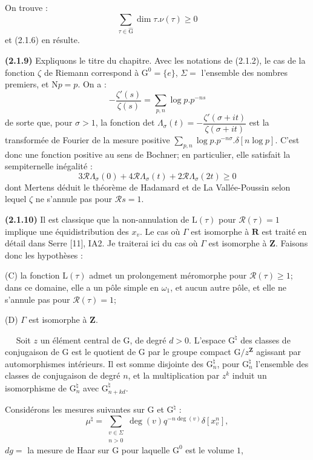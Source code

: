 \documentclass[11pt,leqno]{article}
\newcommand{\Page}[1]{\ifvmode\noindent\else\unskip\ \fi{\footnotesize\textcolor{gray}{[p.\,#1]}}\ \ignorespaces}
\begin{document}
On trouve :
\[
\sum_{\tau\in\widehat{\mathrm{G}}}\dim\tau.\nu(\tau)\geq0
\]
et (2.1.6) en résulte.

\textbf{(2.1.9)} Expliquons le titre du chapitre. Avec les notations de (2.1.2), le cas de la fonction \(\zeta\) de Riemann correspond à \(\mathrm{G}^0=\{e\}\), \(\Sigma=\) l’ensemble des nombres premiers, et \(\mathrm{N}p=p\). On a :
\[
-\frac{\zeta'(s)}{\zeta(s)}
 =\sum_{p,n}\log p.p^{-ns}
\]
de sorte que, pour \(\sigma>1\), la fonction det \(\Lambda_\sigma(t)=-\dfrac{\zeta'(\sigma+it)}{\zeta(\sigma+it)}\) est la transformée de Fourier de la mesure positive \(\displaystyle\sum_{p,n}\log p.p^{-n\sigma}.\delta[n\log p]\). C’est donc une fonction positive au sens de Bochner; en particulier, elle satisfait la sempiternelle inégalité :
\[
3\mathscr{R}\Lambda_\sigma(0)
 +4\mathscr{R}\Lambda_\sigma(t)
 +2\mathscr{R}\Lambda_\sigma(2t)\geq0
\]
dont Mertens déduit le théorème de Hadamard et de La Vallée-Poussin selon lequel \(\zeta\) ne s’annule pas pour \(\mathscr{R}s=1\).

\textbf{(2.1.10)} Il est classique que la non-annulation de \(\mathrm{L}(\tau)\) pour \(\mathscr{R}(\tau)=1\) implique une équidistribution des \(x_v\). Le cas où \(\Gamma\) est isomorphe à \(\mathbf{R}\) est traité en détail dans Serre [11], IA2. Je traiterai ici du cas où \(\Gamma\) est isomorphe à \(\mathbf{Z}\). Faisons donc les hypothèses :

\noindent (C) la fonction \(\mathrm{L}(\tau)\) admet un prolongement méromorphe pour \(\mathscr{R}(\tau)\geq1\); dans ce domaine, elle a un pôle simple en \(\omega_1\), et aucun autre pôle, et elle ne s’annule pas pour \(\mathscr{R}(\tau)=1\);

\noindent (D) \(\Gamma\) est isomorphe à \(\mathbf{Z}\).

\Page{192}
Soit \(z\) un élément central de \(\mathrm{G}\), de degré \(d>0\). L’espace \(\mathrm{G}^{\natural}\) des classes de conjugaison de \(\mathrm{G}\) est le quotient de \(\mathrm{G}\) par le groupe compact \(\mathrm{G}/z^{\mathbf{Z}}\) agissant par automorphismes intérieurs. Il est somme disjointe des \(\mathrm{G}_n^{\natural}\), pour \(\mathrm{G}_n^{\natural}\) l’ensemble des classes de conjugaison de degré \(n\), et la multiplication par \(z^k\) induit un isomorphisme de \(\mathrm{G}_n^{\natural}\) avec \(\mathrm{G}_{n+kd}^{\natural}\).

Considérons les mesures suivantes sur \(\mathrm{G}\) et \(\mathrm{G}^{\natural}\) :
\[
\mu^{\natural}
 =\sum_{\substack{v\in\Sigma\\ n>0}}
   \deg(v)q^{-n\deg(v)}\delta[x_v^n],
\]
\noindent \(dg=\) la mesure de Haar sur \(\mathrm{G}\) pour laquelle \(\mathrm{G}^0\) est le volume \(1\),
\end{document}
